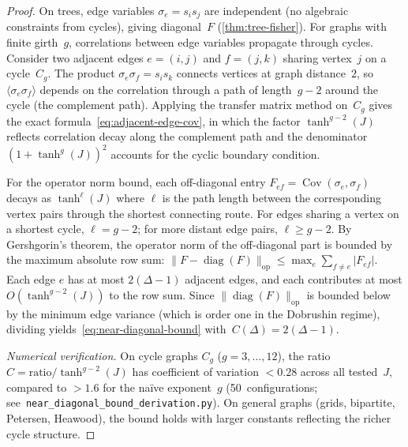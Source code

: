 \documentclass[11pt]{article}
\theoremstyle{definition}
\theoremstyle{remark}
\begin{document}
\begin{proof}
On trees, edge variables $\sigma_e = s_i s_j$ are independent
(no algebraic constraints from cycles), giving diagonal~$F$
(\cref{thm:tree-fisher}).
For graphs with finite girth~$g$, correlations between edge variables
propagate through cycles. Consider two adjacent
edges $e = (i,j)$ and $f = (j,k)$ sharing vertex~$j$ on a
cycle~$C_g$. The product $\sigma_e \sigma_f = s_i s_k$ connects
vertices at graph distance~$2$, so
$\langle \sigma_e \sigma_f \rangle$ depends on the correlation through
a path of length~$g - 2$ around the cycle (the complement path).
Applying the transfer matrix method on~$C_g$ gives the exact
formula~\eqref{eq:adjacent-edge-cov}, in which the factor
$\tanh^{g-2}(J)$ reflects correlation decay along the complement path
and the denominator $(1 + \tanh^g(J))^2$ accounts for the cyclic
boundary condition.

For the operator norm bound, each off-diagonal entry
$F_{ef} = \operatorname{Cov}(\sigma_e, \sigma_f)$ decays as
$\tanh^{\ell}(J)$ where $\ell$ is the path length between the
corresponding vertex pairs through the shortest connecting route.
For edges sharing a vertex on a shortest cycle, $\ell = g - 2$;
for more distant edge pairs, $\ell \geq g - 2$.
By Gershgorin's theorem, the operator norm of the off-diagonal part
is bounded by the maximum absolute row sum:
$\|F - \operatorname{diag}(F)\|_{\text{op}} \leq
\max_e \sum_{f \neq e} |F_{ef}|$.
Each edge $e$ has at most $2(\Delta - 1)$ adjacent edges, and each
contributes at most $O(\tanh^{g-2}(J))$ to the row sum.
Since $\|\operatorname{diag}(F)\|_{\text{op}}$ is bounded below by the
minimum edge variance (which is order one in the Dobrushin regime),
dividing yields~\eqref{eq:near-diagonal-bound}
with~$C(\Delta) = 2(\Delta - 1)$.

\textit{Numerical verification.}
On cycle graphs $C_g$ ($g = 3, \ldots, 12$), the ratio
$C = \text{ratio}/\tanh^{g-2}(J)$ has coefficient of
variation $< 0.28$ across all tested~$J$, compared to $> 1.6$ for
the na\"ive exponent~$g$
(50~configurations; see~\texttt{near\_diagonal\_bound\_derivation.py}).
On general graphs (grids, bipartite, Petersen, Heawood), the bound
holds with larger constants reflecting the richer cycle structure.
\end{proof}
\end{document}
